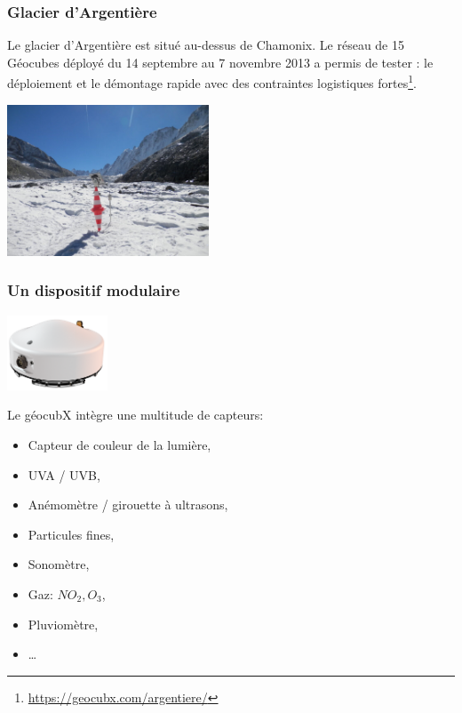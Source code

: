 \documentclass[svgnames,11pt]{beamer}
\begin{document}
\begin{frame}
    \frametitle{Glacier d'Argentière}

Le  glacier d’Argentière est situé au-dessus de Chamonix. Le réseau de 15 Géocubes déployé du 14 septembre au 7 novembre 2013 a permis de tester : le déploiement et le démontage rapide avec des contraintes logistiques fortes\footnote{\url{https://geocubx.com/argentiere/}}.
\begin{center}
\centering
\includegraphics[width=6cm]{ressources/glacier.jpg}
\label{IMG}
\end{center}
\end{frame}
\begin{frame}
    \frametitle{Un dispositif modulaire}

    \begin{center}
    \centering
    \includegraphics[width=3cm]{ressources/module.png}
    \label{IMG}
    \end{center}
Le géocubX intègre une multitude de capteurs:
\begin{itemize}
    \item Capteur de couleur de la lumière,
    \item UVA / UVB,
    \item Anémomètre / girouette à ultrasons,
    \item Particules fines,
    \item Sonomètre,
    \item Gaz: $NO_2, O_3$,
    \item Pluviomètre,
    \item \dots
\end{itemize}
\end{frame}
\end{document}
